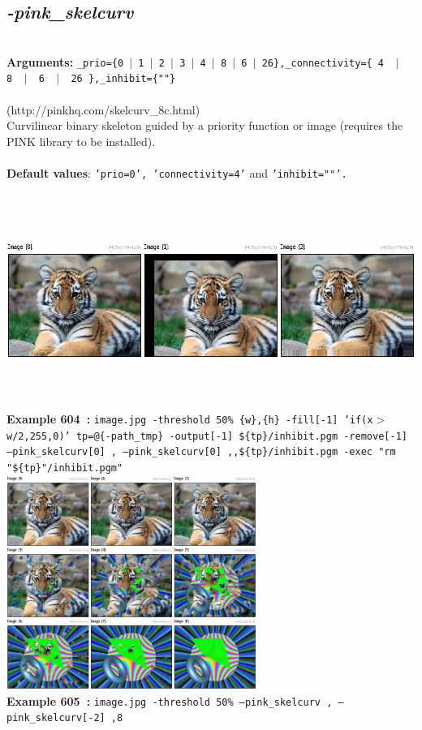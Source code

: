 \documentclass[a4paper,11pt,twoside]{book}
\begin{document}
\subsection{\emph{-pink\_skelcurv} }\vspace*{-0.5em}
~\\\textbf{Arguments: } 
{\small \texttt{\_prio=\{0~$|$~1~$|$~2~$|$~3~$|$~4~$|$~8~$|$~6~$|$~26\},\_connectivity=\{ 4 ~$|$~ 8 ~$|$~ 6 ~$|$~ 26 \},\_inhibit=\{""\}}}\\~\\
(http://pinkhq.com/skelcurv\_8c.html)
~\\Curvilinear binary skeleton guided by a priority function or image (requires the PINK library to be installed).
~\\~\\\textbf{Default values}: {\small \texttt{'prio=0', 'connectivity=4'} and \texttt{'inhibit=""'.}}
\begin{center}\includegraphics[keepaspectratio=true,height=7cm,width=\textwidth]{img/gmic_def604.jpg}\\
{\footnotesize \textbf{Example 604~:} \texttt{image.jpg -threshold 50\% \{w\},\{h\} -fill[-1] 'if(x$>$w/2,255,0)' tp=@\{-path\_tmp\} -output[-1] \$\{tp\}/inhibit.pgm -remove[-1] --pink\_skelcurv[0] , --pink\_skelcurv[0] ,,\$\{tp\}/inhibit.pgm -exec "rm "\$\{tp\}"/inhibit.pgm"}}
\\\includegraphics[keepaspectratio=true,height=7cm,width=\textwidth]{img/gmic_def605.jpg}\\
{\footnotesize \textbf{Example 605~:} \texttt{image.jpg -threshold 50\% --pink\_skelcurv , --pink\_skelcurv[-2] ,8}}
\end{center}
\end{document}
